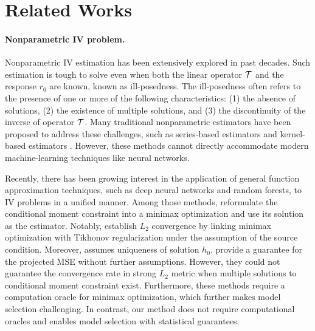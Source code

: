 \vspace{-3mm}
\section{Related Works}
\vspace{-3mm}

\paragraph{Nonparametric IV problem.} 
Nonparametric IV estimation has been extensively explored in past decades. Such estimation is tough to solve even when both the linear operator ${\mathcal{T}}$ and the response $r_0$ are known, known as ill-posedness. The ill-posedness often refers to the presence of one or more
of the following characteristics: (1) the absence of solutions, (2) the existence of multiple solutions, and (3) the discontinuity of the inverse of operator ${\mathcal{T}}$. Many traditional nonparametric estimators have been proposed to address these challenges, such as series-based estimators \citep{florens2011identification,ai2003efficient,chen2021robust,chen2012estimation,darolles2011nonparametric} and kernel-based estimators \citep{hall2005nonparametric,horowitz2007asymptotic,singh2019kernel}. However, these methods cannot directly accommodate modern machine-learning techniques like neural networks.

Recently, there has been growing interest in the application of general function approximation techniques, such
as deep neural networks and random forests, to IV problems in a unified manner. Among those methods, \citet{bennett2020variational,dikkala2020minimax,lewis2018adversarial, liao2020provably,zhang2023instrumental} reformulate the conditional moment constraint into a minimax optimization and use its solution as the estimator. Notably, \citet{liao2020provably,bennett2023source,bennett2023minimax} establish $L_2$ convergence by linking minimax optimization with Tikhonov regularization under the assumption of the source condition. Moreover, \citet{liao2020batch} assumes uniqueness of solution $h_0$. \cite{dikkala2020minimax,lewis2018adversarial} provide a guarantee for the projected MSE without further assumptions. However, they could not guarantee the convergence rate in strong $L_2$ metric when multiple solutions to conditional moment constraint exist. Furthermore, these methods require a computation oracle for minimax optimization, which further makes model selection challenging. 
In contrast, our method does not require computational oracles and enables model selection with statistical guarantees. 

